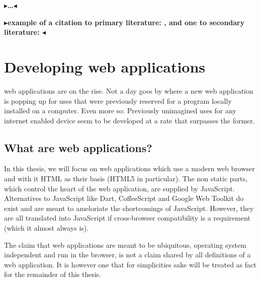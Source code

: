 \documentclass[twoside,11pt,openright]{report}
\newcommand{\todo}[1]{{\color[rgb]{.5,0,0}\textbf{$\blacktriangleright$#1$\blacktriangleleft$}}}
\begin{document}
\todo{\dots}

\todo{example of a citation to primary literature: \citeA{lazypropagation2010},
and one to secondary literature: \citeB{ambiguity2010}}


\chapter{Developing web applications}
web applications are on the rise. Not a day goes by where a new
web application is popping up for uses that were previously reserved for a
program locally installed on a computer. Even more so: Previously
unimagined uses for any internet enabled device seem to be developed
at a rate that surpasses the former.

\section{What are web applications?}
In this thesis, we will focus on web applications which use a
modern web browser and with it HTML as their basis (HTML5 in particular).
The non static parts, which control the heart of the web application,
are supplied by JavaScript.
Alternatives to JavaScript like Dart, CoffeeScript and Google Web Toolkit
do exist and are meant to ameloriate the shortcomings of JavaScript. 
However, they are all translated into JavaScript if cross-browser
compatibility is a requirement (which it almost always is).

The claim that web applications are meant to be ubiquitous,
operating system independent and run in the browser, is not a claim shared
by all definitions of a web application. It is however one that for
simplicities sake will be treated as fact for the remainder of this thesis.
\end{document}
